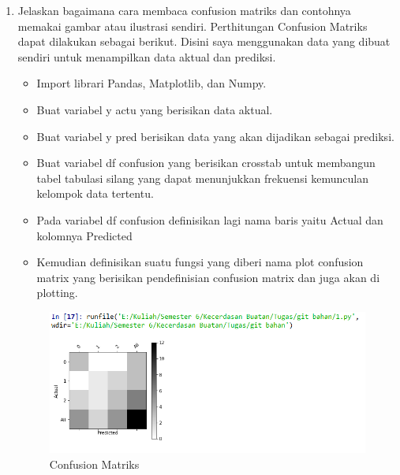 \begin{enumerate}
\item Jelaskan bagaimana cara membaca confusion matriks dan contohnya memakai gambar atau ilustrasi sendiri.
Perthitungan Confusion Matriks dapat dilakukan sebagai berikut. Disini saya menggunakan data yang dibuat sendiri untuk menampilkan data aktual dan prediksi.
\begin{itemize}
\item
Import librari Pandas, Matplotlib, dan Numpy.
\item
Buat variabel y actu yang berisikan data aktual.
\item
Buat variabel y pred berisikan data yang akan dijadikan sebagai prediksi.
\item
Buat variabel df confusion yang berisikan crosstab untuk membangun tabel tabulasi silang yang dapat menunjukkan frekuensi kemunculan kelompok data tertentu.
\item
Pada variabel df confusion definisikan lagi nama baris yaitu Actual dan kolomnya Predicted
\item
Kemudian definisikan suatu fungsi yang diberi nama plot confusion matrix yang berisikan pendefinisian confusion matrix dan juga akan di plotting.

\end{itemize}
\begin{figure}[ht]
\centering
\includegraphics[scale=0.5]{figures/1174031/3/1.PNG}
\caption{Confusion Matriks}
\label{contoh}
\end{figure}


\end{enumerate}
